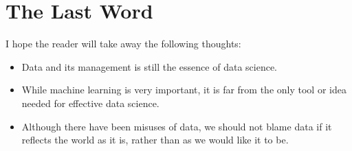 \documentclass[11pt]{article}
\begin{document}
\section{The Last Word}

I hope the reader will take away the following thoughts:

\begin{itemize}

\item
Data and its management is still the essence of data science.

\item
While machine learning is very important, it is far from the only tool or idea needed for effective data science.

\item
Although there have been misuses of data, we should not blame data if it reflects the world as it is, rather than as we would like it to be.

\end{itemize}
\end{document}
